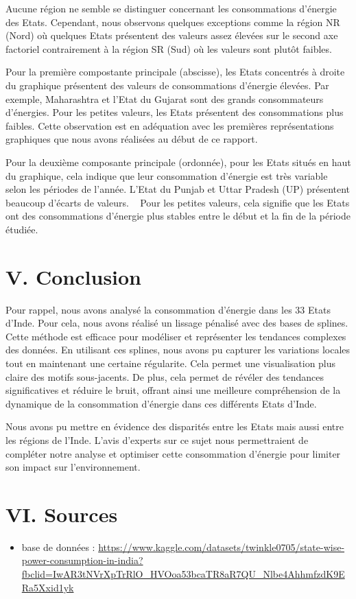 \documentclass[
]{article}
\providecommand{\tightlist}{%
  \setlength{\itemsep}{0pt}\setlength{\parskip}{0pt}}
\begin{document}
Aucune région ne semble se distinguer concernant les consommations
d'énergie des Etats. Cependant, nous observons quelques exceptions comme
la région NR (Nord) où quelques Etats présentent des valeurs assez
élevées sur le second axe factoriel contrairement à la région SR (Sud)
où les valeurs sont plutôt faibles.

Pour la première compostante principale (abscisse), les Etats concentrés
à droite du graphique présentent des valeurs de consommations d'énergie
élevées. Par exemple, Maharashtra et l'Etat du Gujarat sont des grands
consommateurs d'énergies. Pour les petites valeurs, les Etats présentent
des consommations plus faibles. Cette observation est en adéquation avec
les premières représentations graphiques que nous avons réalisées au
début de ce rapport.

Pour la deuxième composante principale (ordonnée), pour les Etats situés
en haut du graphique, cela indique que leur consommation d'énergie est
très variable selon les périodes de l'année. L'Etat du Punjab et Uttar
Pradesh (UP) présentent beaucoup d'écarts de valeurs. ~ Pour les petites
valeurs, cela signifie que les Etats ont des consommations d'énergie
plus stables entre le début et la fin de la période étudiée.

\hypertarget{v.-conclusion}{%
\section{V. Conclusion}\label{v.-conclusion}}

Pour rappel, nous avons analysé la consommation d'énergie dans les 33
Etats d'Inde. Pour cela, nous avons réalisé un lissage pénalisé avec des
bases de splines. Cette méthode est efficace pour modéliser et
représenter les tendances complexes des données. En utilisant ces
splines, nous avons pu capturer les variations locales tout en
maintenant une certaine régularite. Cela permet une visualisation plus
claire des motifs sous-jacents. De plus, cela permet de révéler des
tendances significatives et réduire le bruit, offrant ainsi une
meilleure compréhension de la dynamique de la consommation d'énergie
dans ces différents Etats d'Inde.

Nous avons pu mettre en évidence des disparités entre les Etats mais
aussi entre les régions de l'Inde. L'avis d'experts sur ce sujet nous
permettraient de compléter notre analyse et optimiser cette consommation
d'énergie pour limiter son impact sur l'environnement.

\hypertarget{vi.-sources}{%
\section{VI. Sources}\label{vi.-sources}}

\begin{itemize}
\tightlist
\item
  base de données :
  \url{https://www.kaggle.com/datasets/twinkle0705/state-wise-power-consumption-in-india?fbclid=IwAR3tNVrXpTrRlO_HVOoa53bcaTR8aR7QU_Nlbe4AhhmfzdK9ERa5Xxid1yk}
\end{itemize}
\end{document}
